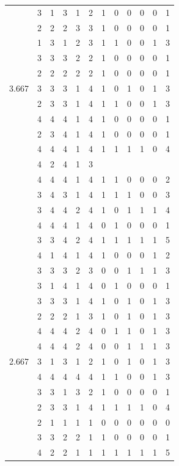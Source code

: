 \documentclass[]{msu-thesis}
\theoremstyle{definition}
\theoremstyle{definition}
\theoremstyle{definition}
\theoremstyle{remark}
\begin{document}
\begin{table}
{\begin{tabular}[t]{rrrrrrrrrrrr}
 & 3 & 1 & 3 & 1 & 2 & 1 & 0 & 0 & 0 & 0 & 1\\
 & 2 & 2 & 2 & 3 & 3 & 1 & 0 & 0 & 0 & 0 & 1\\
 & 1 & 3 & 1 & 2 & 3 & 1 & 1 & 0 & 0 & 1 & 3\\
 & 3 & 3 & 3 & 2 & 2 & 1 & 0 & 0 & 0 & 0 & 1\\
 & 2 & 2 & 2 & 2 & 2 & 1 & 0 & 0 & 0 & 0 & 1\\
3.667 & 3 & 3 & 3 & 1 & 4 & 1 & 0 & 1 & 0 & 1 & 3\\
 & 2 & 3 & 3 & 1 & 4 & 1 & 1 & 0 & 0 & 1 & 3\\
 & 4 & 4 & 4 & 1 & 4 & 1 & 0 & 0 & 0 & 0 & 1\\
 & 2 & 3 & 4 & 1 & 4 & 1 & 0 & 0 & 0 & 0 & 1\\
 & 4 & 4 & 4 & 1 & 4 & 1 & 1 & 1 & 1 & 0 & 4\\
 & 4 & 2 & 4 & 1 & 3 &  &  &  &  &  & \\
 & 4 & 4 & 4 & 1 & 4 & 1 & 1 & 0 & 0 & 0 & 2\\
 & 3 & 4 & 3 & 1 & 4 & 1 & 1 & 1 & 0 & 0 & 3\\
 & 3 & 4 & 4 & 2 & 4 & 1 & 0 & 1 & 1 & 1 & 4\\
 & 4 & 4 & 4 & 1 & 4 & 0 & 1 & 0 & 0 & 0 & 1\\
 & 3 & 3 & 4 & 2 & 4 & 1 & 1 & 1 & 1 & 1 & 5\\
 & 4 & 1 & 4 & 1 & 4 & 1 & 0 & 0 & 0 & 1 & 2\\
 & 3 & 3 & 3 & 2 & 3 & 0 & 0 & 1 & 1 & 1 & 3\\
 & 3 & 1 & 4 & 1 & 4 & 0 & 1 & 0 & 0 & 0 & 1\\
 & 3 & 3 & 3 & 1 & 4 & 1 & 0 & 1 & 0 & 1 & 3\\
 & 2 & 2 & 2 & 1 & 3 & 1 & 0 & 1 & 0 & 1 & 3\\
 & 4 & 4 & 4 & 2 & 4 & 0 & 1 & 1 & 0 & 1 & 3\\
 & 4 & 4 & 4 & 2 & 4 & 0 & 0 & 1 & 1 & 1 & 3\\
2.667 & 3 & 1 & 3 & 1 & 2 & 1 & 0 & 1 & 0 & 1 & 3\\
 & 4 & 4 & 4 & 4 & 4 & 1 & 1 & 0 & 0 & 1 & 3\\
 & 3 & 3 & 1 & 3 & 2 & 1 & 0 & 0 & 0 & 0 & 1\\
 & 2 & 3 & 3 & 1 & 4 & 1 & 1 & 1 & 1 & 0 & 4\\
 & 2 & 1 & 1 & 1 & 1 & 0 & 0 & 0 & 0 & 0 & 0\\
 & 3 & 3 & 2 & 2 & 1 & 1 & 0 & 0 & 0 & 0 & 1\\
 & 4 & 2 & 2 & 1 & 1 & 1 & 1 & 1 & 1 & 1 & 5\\

\end{tabular}}
\end{table}
\end{document}
